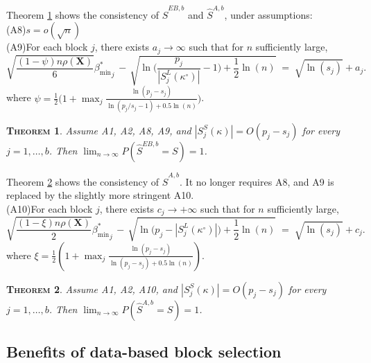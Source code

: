 \documentclass[aos]{imsart}
\theoremstyle{plain}
\newtheorem{thm}{\textsc{Theorem}}[section]
\newcommand{\bs}{\boldsymbol}
\begin{document}
Theorem \ref{theo:empbayesselconsist} shows
the consistency of $\hat{S}^{EB,b}$ and $\hat{S}^{A,b}$, under
assumptions:\\[5pt]
(A8)\quad $s=o(\sqrt{n})$\\[5pt]
(A9)\quad For each block $j$, there exists $a_j\to \infty$ such that for $n$ sufficiently large, 
\begin{equation*}\label{cond:suffIIreg2}
        \sqrt{\frac{ (1-\psi)n\rho(\bs X)}{6}}{{\beta_{\min}^*}_j} \,- \,\sqrt{\ln\bigg(\frac{p_j}{|S^{L}_j(\kappa^{\circ})|}-1\bigg)+\frac12\ln(n)} \;=\; \sqrt{\ln(s_j)} + a_j .
    \end{equation*}
where $\psi=\frac12\big(1+\max_j \frac{\ln(p_j-s_j)}{\ln(p_j/s_j-1)+0.5\ln(n)}\big)$.

\begin{thm}\label{theo:empbayesselconsist}
    Assume A1, A2, A8, A9, and $|S^{S}_j(\kappa)|=O(p_j-s_j)$ for every $j=1,\ldots,b$. Then
$\lim_{n \to \infty} P(\hat{S}^{EB,b} = S)= 1$.
\end{thm}

Theorem \ref{theo:informedl0consist} shows
the consistency of $\hat{S}^{A,b}$. It no longer requires A8, and A9 is replaced by the slightly more stringent A10. \\[5pt]
(A10)\quad For each block $j$, there exists $c_j\to +\infty$ such that for $n$ sufficiently large,
\begin{equation*}
        \sqrt{\frac{ (1-\xi)n\rho(\bs X)}{2}}{\beta_{\min}^*}_j \,- \,\sqrt{\ln\big(p_j-|S^{L}_j(\kappa^{\circ})|\big)+\frac12\ln(n)} \;=\; \sqrt{\ln(s_j)} + c_j .
    \end{equation*}
where  $\xi=\frac12(1+\max_j \frac{\ln(p_j-s_j)}{\ln(p_j-s_j)+0.5\ln(n)})$.

\begin{thm}\label{theo:informedl0consist}
    Assume A1, A2, A10, and $|S^{S}_j(\kappa)|=O(p_j-s_j)$ for every $j=1,\ldots,b$. Then 
$\lim_{n \to \infty} P(\hat{S}^{A,b} = S) = 1$.
\end{thm}

\subsection{Benefits of data-based block selection}
\end{document}
